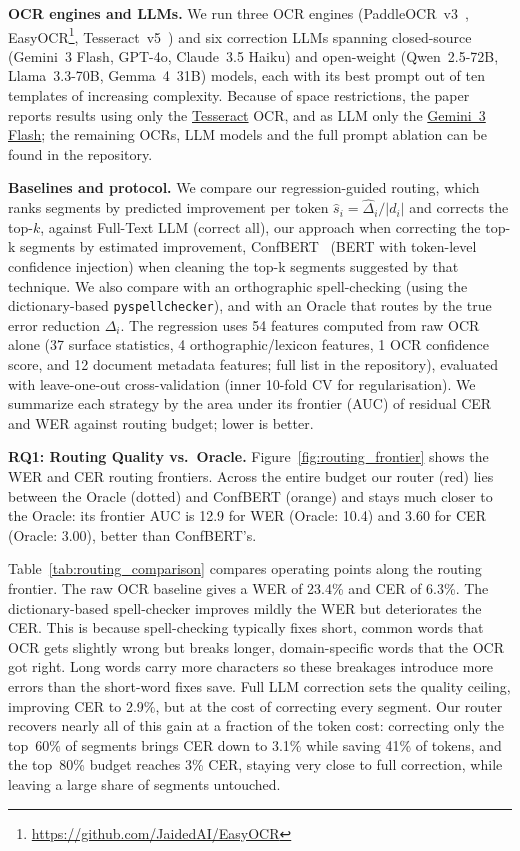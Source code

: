 \documentclass[sigconf]{acmart}
\begin{document}
\noindent\textbf{OCR engines and LLMs.}
We run three OCR engines (PaddleOCR~v3~\cite{cui2025paddleocr}, EasyOCR\footnote{\url{https://github.com/JaidedAI/EasyOCR}}, Tesseract~v5~\cite{tesseractOCR}) and six correction
LLMs spanning closed-source (Gemini~3 Flash, GPT-4o, Claude~3.5 Haiku)\cite{google2025gemini3flash,openai2024gpt4osystemcard, anthropic2024claude35haiku} and
open-weight (Qwen~2.5-72B, Llama~3.3-70B, Gemma~4~31B) \cite{qwen2024qwen25,meta2024llama33,google2026gemma4} models, each with its
best prompt out of ten templates of increasing complexity. Because of space restrictions, the paper reports results using only the \underline{Tesseract} OCR, and as LLM only the \underline{Gemini~3 Flash}; the remaining OCRs, LLM models and the full prompt ablation can be found in the repository.

\medskip\noindent\textbf{Baselines and protocol.}
We compare our regression-guided routing, which ranks segments by
predicted improvement per token $\hat{s}_i = \hat{\Delta}_i / |d_i|$ and corrects
the top-$k$, against Full-Text LLM (correct all), our approach when correcting the top-k segments by estimated improvement, ConfBERT~\cite{10.1007/978-3-031-70442-0_13}
(BERT with token-level confidence injection) when cleaning the top-k segments suggested by that technique. We also compare with an orthographic spell-checking (using the dictionary-based \texttt{pyspellchecker}), and with an
Oracle that routes by the true error reduction $\Delta_i$. The regression uses 54 features computed from raw OCR alone (37 surface statistics, 4 orthographic/lexicon features, 1 OCR confidence score, and 12 document metadata features; full list in the repository), evaluated with
leave-one-out cross-validation (inner 10-fold CV for regularisation). We summarize each strategy by the area under its
frontier (AUC) of residual CER and WER against routing budget; lower is better.


\smallskip\noindent
\textbf{RQ1: Routing Quality vs.\ Oracle.}
Figure~\ref{fig:routing_frontier} shows the WER and CER routing frontiers. Across
the entire budget our router (red) lies between the Oracle (dotted) and ConfBERT
(orange) and stays much closer to the Oracle: its frontier AUC is 12.9 for WER
(Oracle: 10.4) and 3.60 for CER (Oracle: 3.00), better than ConfBERT's. 

Table~\ref{tab:routing_comparison} compares operating points along the routing
frontier. The raw OCR baseline gives a WER of 23.4\% and CER of 6.3\%. The dictionary-based
spell-checker improves mildly the WER but deteriorates the CER. This is because spell-checking typically fixes short, common words that OCR gets slightly wrong but
breaks longer, domain-specific words that the OCR got right. Long words carry
more characters so these breakages introduce more errors than the short-word fixes
save. Full LLM correction sets the quality ceiling, improving
CER to 2.9\%, but at the cost of correcting every segment. Our router recovers
nearly all of this gain at a fraction of the token cost: correcting only the
top~60\% of segments brings CER down to 3.1\% while saving 41\% of tokens, and
the top~80\% budget reaches 3\% CER, staying very close to full correction, while leaving a large share of segments untouched.
\end{document}
